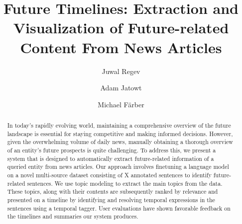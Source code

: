 \documentclass[sigconf]{acmart}
\begin{document}
\title{Future Timelines: Extraction and Visualization of Future-related Content  From News Articles}

\author{Juwal Regev}

\author{Adam Jatowt}

\author{Michael Färber}


\renewcommand{\shortauthors}{Trovato and Tobin, et al.}

\begin{abstract}
In today's rapidly evolving world, maintaining a comprehensive overview of the future landscape is essential for staying competitive and making informed decisions. However, given the overwhelming volume of daily news, manually obtaining a thorough overview of an entity's future prospects is quite challenging. To address this, we present a system that is designed to automatically extract future-related information of a queried entity from news articles. Our approach involves finetuning a language model on a novel multi-source dataset consisting of X annotated sentences to identify future-related sentences. We use topic modeling to extract the main topics from the data. These topics, along with their contents are subsequently ranked by relevance and presented on a timeline by identifying and resolving temporal expressions in the sentences using a temporal tagger. User evaluations have shown favorable feedback on the timelines and summaries our system produces.
\end{abstract}
\end{document}

